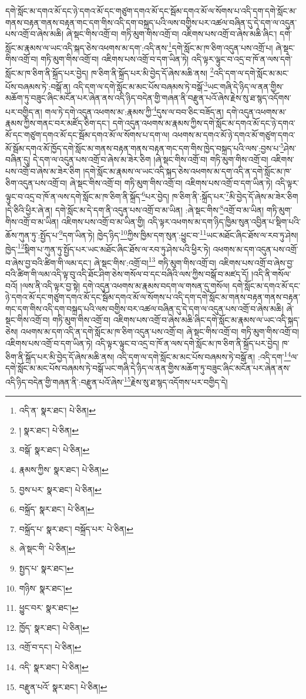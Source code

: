 དགེ་སློང་མ་དགའ་མོ་དང་ཉེ་དགའ་མོ་དང་གཙུག་དགའ་མོ་དང་སྦོམ་དགའ་མོ་ལ་སོགས་པ་འདི་དག་དགེ་སློང་མ་གནས་བརྟན་གནས་བརྟན་གང་དག་གིས་འདི་དག་བསྐྲད་པའི་ལས་བགྱིས་པར་འཚལ་བཞིན་དུ་དེ་དག་ལ་འདུན་པས་འགྲོ་བ་ཞེས་མཆི། ཞེ་སྡང་གིས་འགྲོ་བ། གཏི་མུག་གིས་འགྲོ་བ། འཇིགས་པས་འགྲོ་བ་ཞེས་མཆི་ཞིང་། དགེ་སློང་མ་རྣམས་ལ་ཡང་འདི་སྐད་ཅེས་འཕགས་མ་དག་:འདི་ནས་\footnote{འདི་ན་  སྣར་ཐང་།  པེ་ཅིན། }དགེ་སློང་མ་ཁ་ཅིག་འདུན་པས་འགྲོ་པ། ཞེ་སྡང་གིས་འགྲོ་བ། གཏི་མུག་གིས་འགྲོ་བ། འཇིགས་པས་འགྲོ་བ་དག་ཡིན་ཏེ། འདི་ལྟར་ལྟུང་བ་འདྲ་བ་ཁོ་ན་ལས་དགེ་སློང་མ་ཁ་ཅིག་ནི་སྐྲོད་པར་བྱེད། ཁ་ཅིག་ནི་སྐྲོད་པར་མི་བྱེད་དོ་ཞེས་མཆི་ནས། \footnote{།    སྣར་ཐང་།  པེ་ཅིན། }འདི་དག་ལ་དགེ་སློང་མ་མང་པོས་བཞམས་ཏེ་:བསྒོ་ན། འདི་དག་ལ་དགེ་སློང་མ་མང་པོས་བཞམས་ཏེ་བསྒོ་\footnote{བསྒོ་  སྣར་ཐང་།  པེ་ཅིན། }ཡང་གཞི་དེ་ཉིད་ལ་ནན་གྱིས་མཆོག་ཏུ་བཟུང་ཞིང་མངོན་པར་ཞེན་ནས་འདི་ཉིད་བདེན་གྱི་གཞན་ནི་བརྫུན་པའོ་ཞེས་རྗེས་སུ་ཐ་སྙད་འདོགས་པར་བགྱིད་ན། གལ་ཏེ་དགེ་འདུན་འཕགས་མ་:རྣམས་ཀྱི་\footnote{རྣམས་ཀྱིས་  སྣར་ཐང་།  པེ་ཅིན། }དུས་ལ་བབ་ཅིང་བཟོད་ན། དགེ་འདུན་འཕགས་མ་རྣམས་ཀྱིས་གནང་བར་མཛོད་ཅིག་དང་། དགེ་འདུན་འཕགས་མ་རྣམས་ཀྱིས་དགེ་སློང་མ་དགའ་མོ་དང་ཉེ་དགའ་མོ་དང་གཙུག་དགའ་མོ་དང་སྦོམ་དགའ་མོ་ལ་སོགས་པ་དག་ལ། འཕགས་མ་དགའ་མོ་ཉེ་དགའ་མོ་གཙུག་དགའ་མོ་སྦོམ་དགའ་མོ་ཁྱོད་དགེ་སློང་མ་གནས་བརྟན་གནས་བརྟན་གང་དག་གིས་ཁྱེད་བསྐྲད་པའི་ལས་:བྱས་པ་\footnote{བྱས་པར་  སྣར་ཐང་།  པེ་ཅིན། }ཤེས་བཞིན་དུ། དེ་དག་ལ་འདུན་པས་འགྲོ་བ་ཞེས་མ་ཟེར་ཅིག །ཞེ་སྡང་གིས་འགྲོ་བ། གཏི་མུག་གིས་འགྲོ་བ། འཇིགས་པས་འགྲོ་བ་ཞེས་མ་ཟེར་ཅིག །དགེ་སློང་མ་རྣམས་ལ་ཡང་འདི་སྐད་ཅེས་འཕགས་མ་དག་འདི་ན་དགེ་སློང་མ་ཁ་ཅིག་འདུན་པས་འགྲོ་བ། ཞེ་སྡང་གིས་འགྲོ་བ། གཏི་མུག་གིས་འགྲོ་བ། འཇིགས་པས་འགྲོ་བ་དག་ཡིན་ཏེ། འདི་ལྟར་ལྟུང་བ་འདྲ་བ་ཁོ་ན་ལས་དགེ་སློང་མ་ཁ་ཅིག་ནི་སྐྲོད་\footnote{བསྐྲོད་  སྣར་ཐང་།  པེ་ཅིན། }པར་བྱེད། ཁ་ཅིག་ནི་:སྐྲོད་པར་\footnote{བསྐྲོད་པ་  སྣར་ཐང་། བསྐྲོད་པར་  པེ་ཅིན། }མི་བྱེད་དོ་ཞེས་མ་ཟེར་ཅིག །དེ་ཅིའི་ཕྱིར་ཞེ་ན། དགེ་སློང་མ་དེ་དག་ནི་འདུན་པས་འགྲོ་བ་མ་ཡིན། :ཞེ་སྡང་གིས་\footnote{ཞེ་སྡང་གི་  པེ་ཅིན། }འགྲོ་བ་མ་ཡིན། གཏི་མུག་གིས་འགྲོ་བ་མ་ཡིན། འཇིགས་པས་འགྲོ་བ་མ་ཡིན་གྱི། འདི་ལྟར་འཕགས་མ་དག་ཉིད་ཁྱིམ་སུན་འབྱིན་པ་སྡིག་པའི་ཆོས་ཀུན་ཏུ་:སྤྱོད་པ་\footnote{སྤྱད་པ་  སྣར་ཐང་། }དག་ཡིན་ཏེ། ཁྱེད་ཉིད་\footnote{གཉིས་  སྣར་ཐང་། }ཀྱིས་ཁྱིམ་དག་སུན་:ཕྱུང་བ་\footnote{ཕྱུང་བར་  སྣར་ཐང་། }ཡང་མཐོང་ཞིང་ཐོས་ལ་རབ་ཏུ་ཤེས། ཁྱེད་\footnote{ཁྱོད་  སྣར་ཐང་།  པེ་ཅིན། }སྡིག་པ་ཀུན་ཏུ་སྤྱོད་པར་ཡང་མཐོང་ཞིང་ཐོས་ལ་རབ་ཏུ་ཤེས་པའི་ཕྱིར་ཏེ། འཕགས་མ་དག་འདུན་པས་འགྲོ་བ་ཞེས་བྱ་བའི་ཚིག་གི་ལམ་དང་། ཞེ་སྡང་གིས་:འགྲོ་བ།\footnote{འགྲོ་བ་དང་།  པེ་ཅིན། } གཏི་མུག་གིས་འགྲོ་བ། འཇིགས་པས་འགྲོ་བ་ཞེས་བྱ་བའི་ཚིག་གི་ལམ་འདི་ལྟ་བུ་འདི་ཐོང་ཤིག་ཅེས་གསོལ་བ་དང་བཞིའི་ལས་ཀྱིས་བསྒོ་བ་མཛད་དོ། །འདི་ནི་གསོལ་བའོ། །ལས་ནི་འདི་ལྟར་བྱ་སྟེ། དགེ་འདུན་འཕགས་མ་རྣམས་བདག་ལ་གསན་དུ་གསོལ། དགེ་སློང་མ་དགའ་མོ་དང་ཉེ་དགའ་མོ་དང་གཙུག་དགའ་མོ་དང་སྦོམ་དགའ་མོ་ལ་སོགས་པ་འདི་དག་དགེ་སློང་མ་གནས་བརྟན་གནས་བརྟན་གང་དག་གིས་འདི་དག་བསྐྲད་པའི་ལས་བགྱིས་བར་འཚལ་བཞིན་དུ་དེ་དག་ལ་འདུན་པས་འགྲོ་བ་ཞེས་མཆི། ཞེ་སྡང་གིས་འགྲོ་བ། གཏི་མུག་གིས་འགྲོ་བ། འཇིགས་པས་འགྲོ་བ་ཞེས་མཆི་ཞིང་དགེ་སློང་མ་རྣམས་ལ་ཡང་འདི་སྐད་ཅེས། འཕགས་མ་དག་འདི་ན་དགེ་སློང་མ་ཁ་ཅིག་འདུན་པས་འགྲོ་བ། ཞེ་སྡང་གིས་འགྲོ་བ། གཏི་མུག་གིས་འགྲོ་བ། འཇིགས་པས་འགྲོ་བ་དག་ཡིན་ཏེ། འདི་ལྟར་ལྟུང་བ་འདྲ་བ་ཁོ་ན་ལས་དགེ་སློང་མ་ཁ་ཅིག་ནི་སྐྲོད་པར་བྱེད། ཁ་ཅིག་ནི་སྐྲོད་པར་མི་བྱེད་དོ་ཞེས་མཆི་ནས། འདི་དག་ལ་དགེ་སློང་མ་མང་པོས་བཞམས་ཏེ་བསྒོ་ན། :འདི་དག་\footnote{འདི་  སྣར་ཐང་།  པེ་ཅིན། }ལ་དགེ་སློང་མ་མང་པོས་བཞམས་ཏེ་བསྒོ་ཡང་གཞི་དེ་ཉིད་ལ་ནན་གྱིས་མཆོག་ཏུ་བཟུང་ཞིང་མངོན་པར་ཞེན་ནས་འདི་ཉིད་བདེན་གྱི་གཞན་ནི་:བརྫུན་པའོ་ཞེས་\footnote{བརྫུན་པའོ་  སྣར་ཐང་།  པེ་ཅིན། }རྗེས་སུ་ཐ་སྙད་འདོགས་པར་བགྱིད་དེ། 